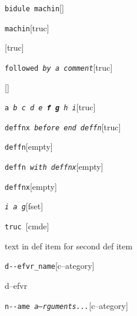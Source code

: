 \documentclass{book}
\begin{document}
%
\noindent\texttt{bidule machin}\hfill[]



%
\noindent\texttt{machin}\hfill[truc]



%
\noindent\texttt{}\hfill[truc]



\noindent\texttt{followed \bgroup{}\normalfont{}\textsl{by a comment}\egroup{}}\hfill[truc]



%
\noindent\texttt{}\hfill[]



\noindent\texttt{a \bgroup{}\normalfont{}\textsl{b c d e \textbf{f g} h i}\egroup{}}\hfill[truc]



%
\noindent\texttt{deffnx \bgroup{}\normalfont{}\textsl{before end deffn}\egroup{}}\hfill[truc]



%


\noindent\texttt{deffn}\hfill[empty]



%

\noindent\texttt{deffn \bgroup{}\normalfont{}\textsl{with deffnx}\egroup{}}\hfill[empty]



%
\noindent\texttt{deffnx}\hfill[empty]



%

\noindent\texttt{\textsl{i} \bgroup{}\normalfont{}\textsl{a g}\egroup{}}\hfill[fset]



%
\noindent\texttt{truc \bgroup{}\normalfont{}\textsl{}\egroup{}}\hfill[cmde]



%
text in def item for second def item


\noindent\texttt{d{-}{-}efvr\_name}\hfill[c--ategory]



%
d--efvr

\noindent\texttt{n{-}{-}ame \bgroup{}\normalfont{}\textsl{a--rguments...}\egroup{}}\hfill[c--ategory]
\end{document}
